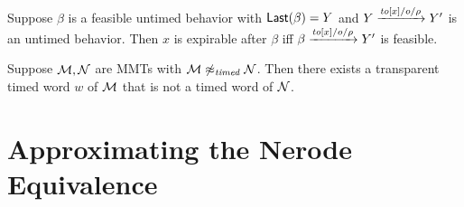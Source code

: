 \begin{lemma}
\label{expirable}
Suppose $\beta$ is a feasible untimed behavior with $\mathsf{Last}({\beta}) = Y$ and $Y \xrightarrow{\mathit{to}[x]/o/\rho} Y'$ is an untimed behavior.
Then $x$ is expirable after $\beta$ iff $\beta \xrightarrow{\mathit{to}[x]/o/\rho} Y'$ is feasible.
\end{lemma}



\begin{lemma}
\label{not timed}
Suppose ${\mathcal M}, {\mathcal N}$ are MMTs with ${\mathcal M} \not\approx_{\mathit{timed}} {\mathcal N}$.
Then there exists a transparent timed word $w$ of ${\mathcal M}$ that is not a timed word of ${\mathcal N}$.
\end{lemma}



\section{Approximating the Nerode Equivalence}
\label{sec:approx}

